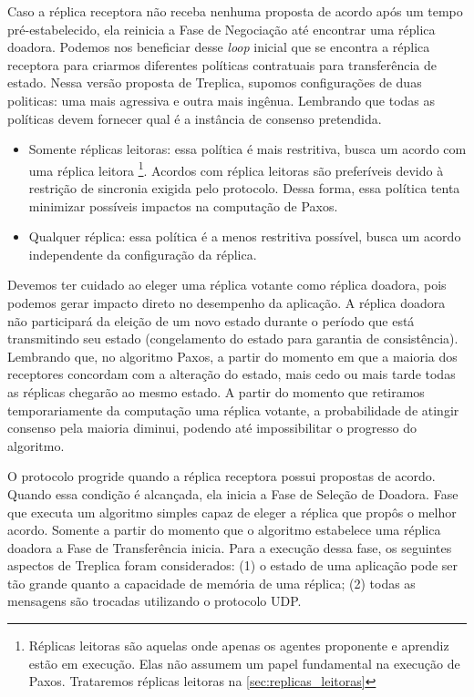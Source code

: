Caso a réplica receptora não receba nenhuma proposta de acordo após um tempo
pré-estabelecido, ela reinicia a Fase de Negociação até encontrar uma réplica doadora.
Podemos nos beneficiar desse \emph{loop} inicial que se encontra a réplica receptora para
criarmos diferentes políticas contratuais para transferência de estado. Nessa versão
proposta de Treplica, supomos configurações de duas politicas: uma mais agressiva e outra
mais ingênua. Lembrando que todas as políticas devem fornecer qual é a instância de
consenso pretendida.

\begin{itemize}
  \item Somente réplicas leitoras: essa política é mais restritiva, busca um acordo com
    uma réplica leitora \footnote{Réplicas leitoras são aquelas onde apenas os agentes
    proponente e aprendiz estão em execução. Elas não assumem um papel fundamental na
    execução de Paxos. Trataremos réplicas leitoras na \autoref{sec:replicas_leitoras}}.
    Acordos com réplica leitoras são preferíveis devido à restrição de sincronia exigida
    pelo protocolo. Dessa forma, essa política tenta minimizar possíveis impactos na
    computação de Paxos.
  \item Qualquer réplica: essa política é a menos restritiva possível, busca um acordo
    independente da configuração da réplica.
\end{itemize}

Devemos ter cuidado ao eleger uma réplica votante como réplica doadora, pois podemos gerar
impacto direto no desempenho da aplicação. A réplica doadora não participará da eleição de
um novo estado durante o período que está transmitindo seu estado (congelamento do estado
para garantia de consistência). Lembrando que, no algoritmo Paxos, a partir do momento em
que a maioria dos receptores concordam com a alteração do estado, mais cedo ou mais tarde
todas as réplicas chegarão ao mesmo estado. A partir do momento que retiramos
temporariamente da computação uma réplica votante, a probabilidade de atingir consenso
pela maioria diminui, podendo até impossibilitar o progresso do algoritmo.

O protocolo progride quando a réplica receptora possui propostas de acordo. Quando essa
condição é alcançada, ela inicia a Fase de Seleção de Doadora. Fase que executa um
algoritmo simples capaz de eleger a réplica que propôs o melhor acordo. Somente a partir
do momento que o algoritmo estabelece uma réplica doadora a Fase de Transferência inicia.
Para a execução dessa fase, os seguintes aspectos de Treplica foram considerados: (1) o
estado de uma aplicação pode ser tão grande quanto a capacidade de memória de uma réplica;
(2) todas as mensagens são trocadas utilizando o protocolo UDP.


